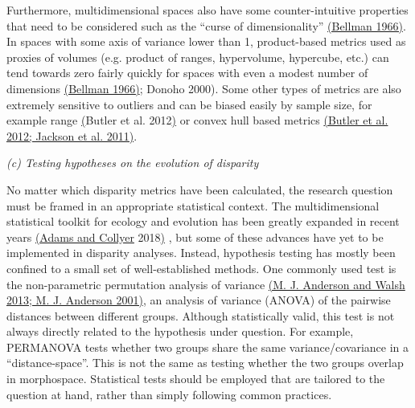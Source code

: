 \documentclass[12pt,letterpaper]{article}
\renewcommand{\subsection}[1]{%
\bigskip
\begin{center}
\begin{large}
\normalfont\itshape #1
\end{large}
\end{center}}
\begin{document}
Furthermore, multidimensional spaces also have some counter-intuitive properties that need to be considered such as the ``curse of dimensionality'' \href{https://paperpile.com/c/sTGYvp/Qsl3}{(Bellman 1966)}.
In spaces with some axis of variance lower than 1, product-based metrics used as proxies of volumes (e.g. product of ranges, hypervolume, hypercube, etc.) can tend towards zero fairly quickly for spaces with even a modest number of dimensions \href{https://paperpile.com/c/sTGYvp/Qsl3}{(Bellman 1966)}; Donoho 2000).
Some other types of metrics are also extremely sensitive to outliers and can be biased easily by sample size, for example range \href{https://paperpile.com/c/sTGYvp/aSSL}{(}Butler et al. 2012\href{https://paperpile.com/c/sTGYvp/aSSL}{)}
or convex hull based metrics \href{https://paperpile.com/c/sTGYvp/aSSL+PwyQ}{(Butler et al. 2012; Jackson et al. 2011)}.

\hypertarget{c-testing-hypotheses-on-the-evolution-of-disparity}{%
\subsection{(c) Testing hypotheses on the evolution of
disparity}\label{c-testing-hypotheses-on-the-evolution-of-disparity}}

No matter which disparity metrics have been calculated, the research question must be framed in an appropriate statistical context.
The multidimensional statistical toolkit for ecology and evolution has been greatly expanded in recent years \href{https://paperpile.com/c/sTGYvp/ZnDd}{(Adams and Collyer} 2018\href{https://paperpile.com/c/sTGYvp/ZnDd}{)}
, but some of these advances have yet to be implemented in disparity analyses. Instead, hypothesis testing has mostly been confined to a small set of well-established methods.
One commonly used test is the non-parametric permutation analysis of variance \href{https://paperpile.com/c/sTGYvp/3hy2+SC6L}{(M. J. Anderson and Walsh 2013; M. J. Anderson 2001)}, an analysis of variance (ANOVA) of the pairwise distances between different groups.
Although statistically valid, this test is not always directly related to the hypothesis under question.
For example, PERMANOVA tests whether two groups share the same variance/covariance in a ``distance-space''.
This is not the same as testing whether the two groups overlap in morphospace.
Statistical tests should be employed that are tailored to the question at hand, rather than simply following common practices.
\end{document}
